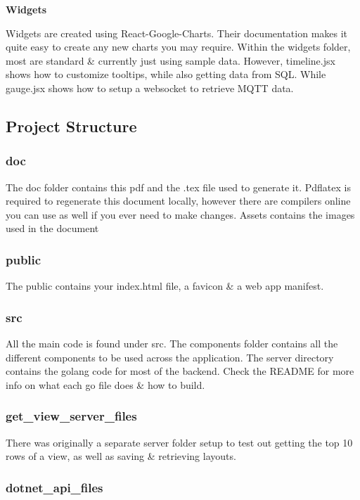 \documentclass[12pt, titlepage]{article}
\begin{document}
\textbf{Widgets}

\noindent Widgets are created using React-Google-Charts. Their documentation makes it quite easy to create any new charts you may require. Within the widgets folder, most are standard \& currently just using sample data. However, timeline.jsx shows how to customize tooltips, while also getting data from SQL. While gauge.jsx shows how to setup a websocket to retrieve MQTT data. 


\subsection{Project Structure}
\subsubsection{doc}

The doc folder contains this pdf and the .tex file used to generate it. Pdflatex is required to regenerate this document locally, however there are compilers online you can use as well if you ever need to make changes. Assets contains the images used in the document

\subsubsection{public}

The public contains your index.html file, a favicon \& a web app manifest. 

\subsubsection{src}

All the main code is found under src. The components folder contains all the different components to be used across the application. The server directory contains the golang code for most of the backend. Check the README for more info on what each go file does \& how to build.

\subsubsection{get\_view\_server\_files}

There was originally a separate server folder setup to test out getting the top 10 rows of a view, as well as saving \& retrieving layouts. 

\subsubsection{dotnet\_api\_files}
\end{document}
